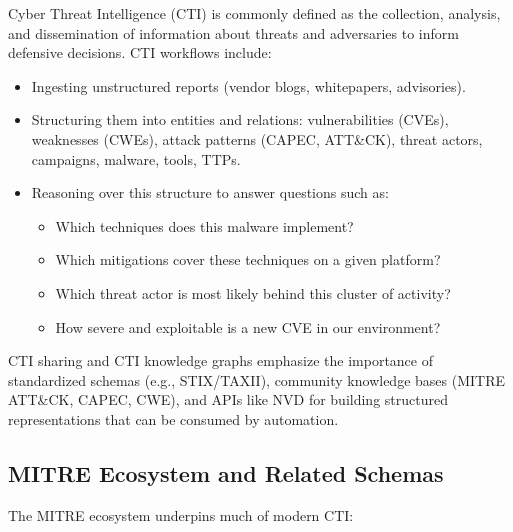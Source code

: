 \documentclass[10pt]{article}
\begin{document}
Cyber Threat Intelligence (CTI) is commonly defined as the collection, analysis, and dissemination of information about threats and adversaries to inform defensive decisions.\cite{mcmillan2013gartner} CTI workflows include:

\begin{itemize}[leftmargin=*]
  \item Ingesting unstructured reports (vendor blogs, whitepapers, advisories).
  \item Structuring them into entities and relations: vulnerabilities (CVEs), weaknesses (CWEs), attack patterns (CAPEC, ATT\&CK), threat actors, campaigns, malware, tools, TTPs.
  \item Reasoning over this structure to answer questions such as:
    \begin{itemize}
      \item Which techniques does this malware implement?
      \item Which mitigations cover these techniques on a given platform?
      \item Which threat actor is most likely behind this cluster of activity?
      \item How severe and exploitable is a new CVE in our environment?
    \end{itemize}
\end{itemize}

CTI sharing and CTI knowledge graphs emphasize the importance of standardized schemas (e.g., STIX/TAXII), community knowledge bases (MITRE ATT\&CK, CAPEC, CWE), and APIs like NVD for building structured representations that can be consumed by automation.\cite{strom2018mitreattck,mitreCVE,mitreCWE,mitreCAPEC}

\subsection{MITRE Ecosystem and Related Schemas}

The MITRE ecosystem underpins much of modern CTI:
\end{document}
